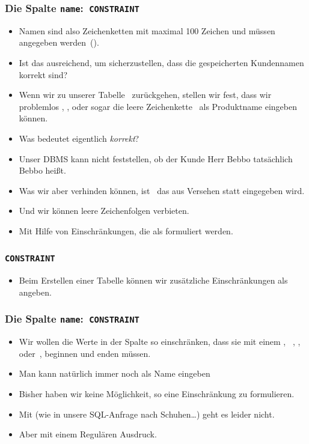 \documentclass[aspectratio=169,mathserif,notheorems]{beamer}%
\begin{document}
\begin{frame}%
\frametitle{Die Spalte \texttt{name}:~\texttt{CONSTRAINT}}%
\begin{itemize}%
\item Namen sind also Zeichenketten mit maximal 100 Zeichen und müssen angegeben werden~().
\item<2-> Ist das ausreichend, um sicherzustellen, dass die gespeicherten Kundennamen korrekt sind?%
\item<3-> Wenn wir zu unserer Tabelle~ zurückgehen, stellen wir fest, dass wir problemlos , , oder sogar die leere Zeichenkette~ als Produktname eingeben können.%
\item<5-> Was bedeutet eigentlich \emph{korrekt}?%
\item<6-> Unser DBMS kann nicht feststellen, ob der Kunde Herr Bebbo tatsächlich Bebbo heißt.%
\item<7-> Was wir aber verhinden können, ist \DEzB\ das aus Versehen  statt  eingegeben wird.%
\item<8-> Und wir können leere Zeichenfolgen verbieten.%
\item<9-> Mit Hilfe von Einschränkungen, die als  formuliert werden\cite{PGDG:PD:C}.%
\end{itemize}%
\end{frame}%
%
%
\begin{frame}[t]
\frametitle{\texttt{CONSTRAINT}}%
\begin{itemize}%
\item Beim Erstellen einer Tabelle können wir zusätzliche Einschränkungen als  angeben.%
\end{itemize}%
%
\end{frame}
%
\begin{frame}%
\frametitle{Die Spalte \texttt{name}:~\texttt{CONSTRAINT}}%
\begin{itemize}%
\item Wir wollen die Werte in der Spalte  so einschränken, dass sie mit einem , \DEzB~, , oder~, beginnen und enden müssen.%
\item<3-> Man kann natürlich immer noch  als Name eingeben%
\item<5-> Bisher haben wir keine Möglichkeit, so eine Einschränkung zu formulieren.%
\item<6-> Mit  (wie in unsere SQL-Anfrage nach Schuhen\dots) geht es leider nicht.%
\item<7-> Aber mit einem \alert{Regulären Ausdruck}.%
\end{itemize}%
\end{frame}%
\end{document}
